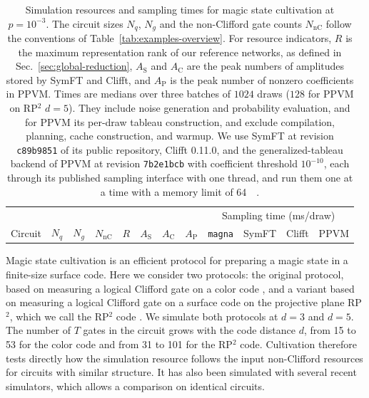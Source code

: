 \documentclass[aps,prx,twocolumn,superscriptaddress,longbibliography]{revtex4-2}
\newcommand{\simname}{\texttt{magna}}
\begin{document}
\begin{table}[t]
\caption{Simulation resources and sampling times for magic state cultivation at $p=10^{-3}$.
The circuit sizes $N_q$, $N_g$ and the non-Clifford gate counts $N_{\text{nC}}$
follow the conventions of Table~\ref{tab:examples-overview}.
For resource indicators, $R$ is the maximum representation rank of our reference networks, as defined in Sec.~\ref{sec:global-reduction},
$A_{\text{S}}$ and $A_{\text{C}}$ are the peak numbers of amplitudes stored by SymFT and Clifft,
and $A_{\text{P}}$ is the peak number of nonzero coefficients in PPVM.
Times are medians over three batches of $1024$ draws ($128$ for PPVM on RP$^2$ $d=5$).
They include noise generation and probability evaluation, and for PPVM its per-draw tableau construction,
and exclude compilation, planning, cache construction, and warmup.
We use SymFT at revision \texttt{c89b9851} of its public repository, Clifft 0.11.0,
and the generalized-tableau backend of PPVM at revision \texttt{7b2e1bcb} with coefficient threshold $10^{-10}$,
each through its published sampling interface with one thread,
and run them one at a time with a memory limit of \qty{64}{\gibi\byte}.}
\label{tab:cultivation-resources}
\begin{ruledtabular}
\small
\setlength{\tabcolsep}{2pt}
\begin{tabular}{lrrrrrrrrrrr}
\multicolumn{8}{c}{} & \multicolumn{4}{c}{Sampling time (\unit{\milli\second}/draw)} \\
Circuit & $N_q$ & $N_g$ & $N_{\text{nC}}$ & $R$ & $A_{\text{S}}$ & $A_{\text{C}}$ & $A_{\text{P}}$ & \simname & SymFT & Clifft & PPVM \\
\hline

\end{tabular}
\end{ruledtabular}
\end{table}

Magic state cultivation \cite{gidneyMagicStateCultivation2024} is an efficient protocol
for preparing a magic state in a finite-size surface code.
Here we consider two protocols:
the original protocol, based on measuring a logical Clifford gate on a color code
\cite{gidneyMagicStateCultivation2024},
and a variant based on measuring a logical Clifford gate on a surface code
on the projective plane RP$^2$, which we call the RP$^2$ code
\cite{chenEfficientMagicState2025}.
We simulate both protocols at $d=3$ and $d=5$.
The number of $T$ gates in the circuit grows with the code distance $d$,
from 15 to 53 for the color code and from 31 to 101 for the RP$^2$ code.
Cultivation therefore tests directly how the simulation resource follows the input non-Clifford resources for circuits with similar structure.
It has also been simulated with several recent simulators,
which allows a comparison on identical circuits.
\end{document}
